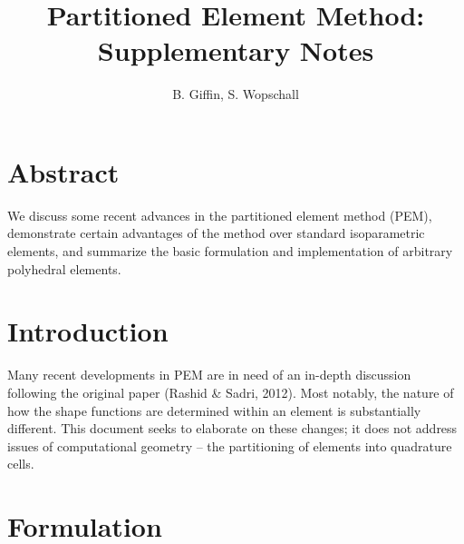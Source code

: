 \documentclass[11pt]{article} %
\title{\textbf{Partitioned Element Method: Supplementary Notes}}
\author{B. Giffin, S. Wopschall}
\date{}
\begin{document}
\maketitle

\section{Abstract}

We discuss some recent advances in the partitioned element method (PEM), demonstrate certain advantages of the method over standard isoparametric elements, and summarize the basic formulation and implementation of arbitrary polyhedral elements.

\section{Introduction}

Many recent developments in PEM are in need of an in-depth discussion following the original paper (Rashid \& Sadri, 2012). Most notably, the nature of how the shape functions are determined within an element is substantially different. This document seeks to elaborate on these changes; it does not address issues of computational geometry -- the partitioning of elements into quadrature cells.

\section{Formulation}
\end{document}
